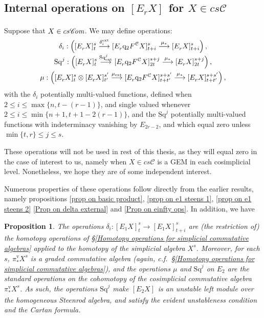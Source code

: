 \documentclass[11pt]{amsart} \renewcommand{\baselinestretch}{1.2}
\theoremstyle{plain}
\newtheorem{prop}[thm]{Proposition}
\numberwithin{equation}{section} %
\theoremstyle{plain}
\newtheorem{prop}[thm]{Proposition}
\numberwithin{equation}{chapter} %
\renewcommand{\to}{\longrightarrow}
\newcommand{\scrC}{\mathscr{C}}
\newcommand{\calc}{\mathcal{C}}
\newcommand{\quadgrad}[1]{\mathrm{q}_{#1}}
\newcommand{\Sq}{\mathrm{Sq}}
\newcommand{\algs}{{\scrC\!\textit{\normalfont\textit{om}}}}
\newcommand{\E}[5]{[E^{#1}_{#2}#3]^{#4}_{#5}}
\newcommand{\Edownup}[5]{[E_{#1}^{#2}#3]^{#4}_{#5}}
\newcommand{\uver}{^\mathrm{v}}
\newcommand{\SubsectionOrSection}[1]{\subsection{#1}}
\begin{document}
\begin{second quadrant homotopy sseq operations}
\SubsectionOrSection{Internal operations on $\E{}{r}{X}{}{}$ for $X\in cs\calc$}
\label{The case of a cosimplicial simplicial commutative algebra}
Suppose that $X\in cs\algs$. We may define operations:
\begin{gather*}
\delta_i:\left(\Edownup{r}{}{X}{s}{t} \smash{{}\overset{\delta_i^\textup{ext}}{\to}{}} \Edownup{r}{}{\quadgrad{2}F^\calc X}{s}{t+i}\overset{\mu_*}{\to} 
\Edownup{r}{}{X}{s}{t+i}\right),
\\
\Sq^j:\left(\Edownup{r}{}{X}{s}{t}   \smash{{}\overset{\Sq^j_\textup{ext}}{\to}{}} \Edownup{r}{}{\quadgrad{2}F^\calc X}{s+j}{2t}\overset{\mu_*}{\to} 
\Edownup{r}{}{X}{s+j}{2t}\right),\\
\mu:\left(\Edownup{r}{}{X}{s}{t}\otimes \Edownup{r}{}{X}{s'}{t'}\smash{{}\overset{\mu_\textup{ext}}{\to}{}} \Edownup{r}{}{\quadgrad{2}F^\calc X}{s+s'}{t+t'}\overset{\mu_*}{\to} 
\Edownup{r}{}{X}{s+s'}{t+t'}\right),
\end{gather*}
with the $\delta_i$ potentially multi-valued functions,  defined when $2\leq i\leq \max\{n,t-(r-1)\}$, and single valued whenever $2\leq i\leq\min\{n+1,t+1-2(r-1)\}$, and the $\Sq^j$ potentially multi-valued functions with indeterminacy vanishing by $E_{2r-2}$, and which equal zero unless $\min\{t,r\}\leq j\leq s$. 

These operations will not be used in rest of this thesis, as they will equal zero in the case of interest to us, namely when $X\in cs\calc$ is a GEM in each cosimplicial level. Nonetheless, we hope they are of some independent interest. 

Numerous properties of these operations follow directly from the earlier results, namely propositions \ref{prop on basic product}, \ref{prop on e1 steens 1}, \ref{prop on e1 steens 2} \ref{Prop on delta external} and \ref{Prop on einfty ops}. In addition, we have


\begin{prop}
\label{final generic prop for basic sseq ops}
The operations $\delta_i:\Edownup{1}{}{X}{s}{t}\to \Edownup{1}{}{X}{s}{t+i}$
are (the restriction of) the homotopy operations of \S\ref{Homotopy operations for simplicial commutative algebras} applied to the homotopy of the simplicial algebra $X^{s}$. Moreover, for each $s$, $\pi\uver_*X^s$ is a graded commutative algebra (again, c.f.\ \S\ref{Homotopy operations for simplicial commutative algebras}), and the operations $\mu$ and $\Sq^j$ on $E_2$ are the standard operations on the cohomotopy of the cosimplicial commutative algebra $\pi\uver_*X^s$. As such, the operations $\Sq^j$ make $\Edownup{2}{}{X}{}{}$ is an unstable left module over the homogeneous Steenrod algebra, and satisfy the evident unstableness condition and the Cartan formula.


\end{prop}
\end{second quadrant homotopy sseq operations}
\end{document}
